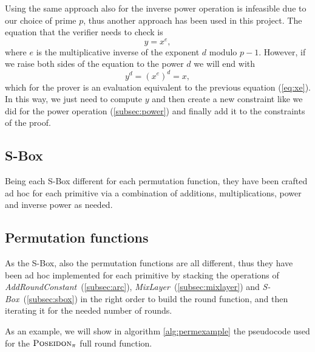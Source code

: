 \documentclass[12pt, a4paper]{report}
\begin{document}
Using the same approach also for the inverse power operation is infeasible due to our choice of prime $p$, thus another approach has been used in this project.
The equation that the verifier needs to check is
\begin{equation}
  y = x^e ,
  \label{eq:xe}
\end{equation}
where $e$ is the multiplicative inverse of the exponent $d$ modulo $p-1$.
However, if we raise both sides of the equation to the power $d$ we will end with
\begin{equation}
  y^d = (x^e)^d = x ,
  \label{eq:xed}
\end{equation}
which for the prover is an evaluation equivalent to the previous equation (\ref{eq:xe}).
In this way, we just need to compute $y$ and then create a new constraint like we did for the power operation (\autoref{subsec:power}) and finally add it to the constraints of the proof.

\subsection{S-Box}\label{subsec:sbox}

Being each S-Box different for each permutation function, they have been crafted ad hoc for each primitive via a combination of additions, multiplications, power and inverse power as needed.

\subsection{Permutation functions}\label{subsec:perm}

As the S-Box, also the permutation functions are all different, thus they have been ad hoc implemented for each primitive by stacking the operations of \textit{AddRoundConstant}~(\autoref{subsec:arc}), \textit{MixLayer}~(\autoref{subsec:mixlayer}) and \textit{S-Box}~(\autoref{subsec:sbox}) in the right order to build the round function, and then iterating it for the needed number of rounds.

As an example, we will show in algorithm \ref{alg:permexample} the pseudocode used for the $\textsc{Poseidon}_\pi$ full round function.
\end{document}
